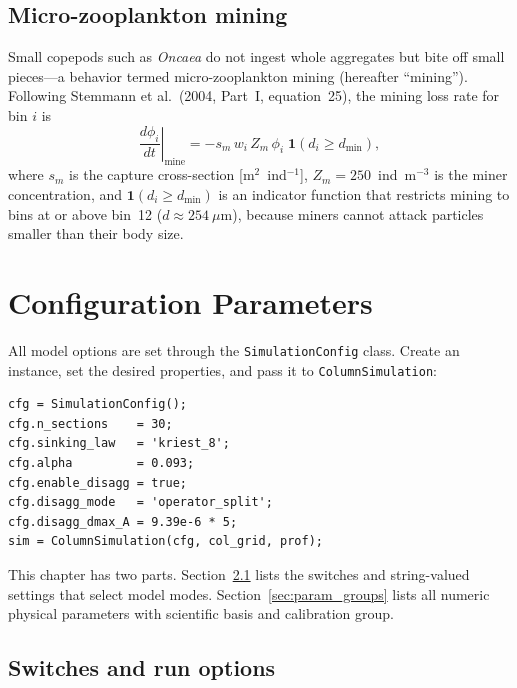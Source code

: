 \documentclass[12pt,a4paper]{report}
\numberwithin{equation}{chapter}
\begin{document}
\section{Micro-zooplankton mining}

Small copepods such as \textit{Oncaea} do not ingest whole aggregates but
bite off small pieces---a behavior termed micro-zooplankton mining
(hereafter ``mining''). Following Stemmann et al.\ (2004, Part~I,
equation~25), the mining loss rate for bin $i$ is
\begin{equation}
    \left.\frac{d\phi_i}{dt}\right|_\mathrm{mine}
    = -s_m\,w_i\,Z_m\,\phi_i\;\mathbf{1}(d_i \geq d_\mathrm{min}),
    \label{eq:mining}
\end{equation}
where $s_m$ is the capture cross-section [m$^2$~ind$^{-1}$],
$Z_m = 250$~ind~m$^{-3}$ is the miner concentration, and
$\mathbf{1}(d_i \geq d_\mathrm{min})$ is an indicator function that
restricts mining to bins at or above bin~12 ($d \approx 254~\mu$m), because
miners cannot attack particles smaller than their body size.

\chapter{Configuration Parameters}
\label{sec:params}

All model options are set through the \texttt{SimulationConfig} class.
Create an instance, set the desired properties, and pass it to
\texttt{ColumnSimulation}:

\begin{lstlisting}
cfg = SimulationConfig();
cfg.n_sections    = 30;
cfg.sinking_law   = 'kriest_8';
cfg.alpha         = 0.093;
cfg.enable_disagg = true;
cfg.disagg_mode   = 'operator_split';
cfg.disagg_dmax_A = 9.39e-6 * 5;
sim = ColumnSimulation(cfg, col_grid, prof);
\end{lstlisting}

This chapter has two parts. Section~\ref{sec:switches} lists the switches and
string-valued settings that select model modes. Section~\ref{sec:param_groups}
lists all numeric physical parameters with scientific basis and calibration group.

\section{Switches and run options}
\label{sec:switches}
\end{document}
